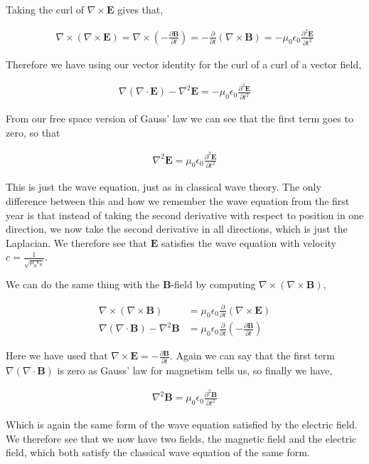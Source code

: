 \documentclass[11pt]{amsart}
\begin{document}
Taking the curl of $\nabla\times\mathbf{E}$ gives that,

\begin{align*}
  \nabla\times(\nabla\times\mathbf{E}) = \nabla\times\left(-\frac{\partial\mathbf{B}}{\partial t}\right) = -\frac{\partial}{\partial t} \left(\nabla\times\mathbf{B}\right) = -\mu_0\epsilon_0\frac{\partial^2\mathbf{E}}{\partial t^2}
\end{align*}

Therefore we have using our vector identity for the curl of a curl of a vector field,

\begin{align*}
  \nabla(\nabla\cdot\mathbf{E}) - \nabla^2 \mathbf{E} = -\mu_0\epsilon_0\frac{\partial^2\mathbf{E}}{\partial t^2}
\end{align*}

From our free space version of Gauss' law we can see that the first term goes to zero, so that

\begin{align*}
  \nabla^2\mathbf{E} = \mu_0\epsilon_0\frac{\partial^2\mathbf{E}}{\partial t^2}
\end{align*}

This is just the wave equation, just as in classical wave theory. The only difference between this and how we remember the wave equation from the first year is that instead of taking the second derivative with respect to position in one direction, we now take the second derivative in all directions, which is just the Laplacian. We therefore see that $\mathbf{E}$ satisfies the wave equation with velocity $c = \frac{1}{\sqrt{\mu_0\epsilon_0}}$.

We can do the same thing with the $\mathbf{B}$-field by computing $\nabla\times(\nabla\times\mathbf{B})$,

\begin{align*}
  \nabla\times(\nabla\times\mathbf{B}) &= \mu_0\epsilon_0\frac{\partial}{\partial t}(\nabla\times\mathbf{E}) \\
  \nabla(\nabla\cdot\mathbf{B}) - \nabla^2\mathbf{B} &= \mu_0\epsilon_0\frac{\partial}{\partial t}\left(-\frac{\partial\mathbf{B}}{\partial t}\right)
\end{align*}

Here we have used that $\nabla\times\mathbf{E} = -\frac{\partial\mathbf{B}}{\partial t}$. Again we can say that the first term $\nabla(\nabla\cdot\mathbf{B})$ is zero as Gauss' law for magnetism tells us, so finally we have,

\begin{align*}
  \nabla^2\mathbf{B} = \mu_0\epsilon_0\frac{\partial^2\mathbf{B}}{\partial t^2}
\end{align*}

Which is again the same form of the wave equation satisfied by the electric field. We therefore see that we now have two fields, the magnetic field and the electric field, which both satisfy the classical wave equation of the same form.
\end{document}
